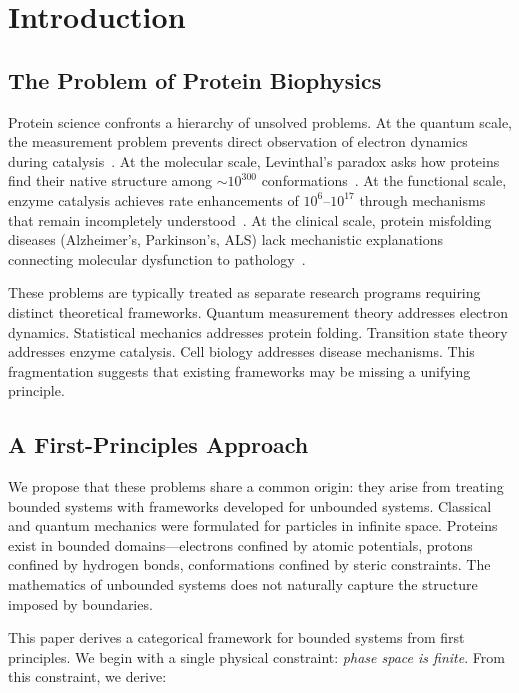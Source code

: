 \documentclass[twocolumn,aps,prx,superscriptaddress,longbibliography]{revtex4-2}
\theoremstyle{remark}
\begin{document}
\section{Introduction}
\label{sec:introduction}

\subsection{The Problem of Protein Biophysics}

Protein science confronts a hierarchy of unsolved problems. At the quantum
scale, the measurement problem prevents direct observation of electron
dynamics during catalysis~\cite{Heisenberg1927}. At the molecular scale,
Levinthal's paradox asks how proteins find their native structure among
$\sim 10^{300}$ conformations~\cite{levinthal1969fold}. At the functional
scale, enzyme catalysis achieves rate enhancements of $10^{6}$--$10^{17}$
through mechanisms that remain incompletely understood~\cite{Wolfenden2001}.
At the clinical scale, protein misfolding diseases (Alzheimer's, Parkinson's,
ALS) lack mechanistic explanations connecting molecular dysfunction to
pathology~\cite{Chiti2017}.

These problems are typically treated as separate research programs requiring
distinct theoretical frameworks. Quantum measurement theory addresses electron
dynamics. Statistical mechanics addresses protein folding. Transition state
theory addresses enzyme catalysis. Cell biology addresses disease mechanisms.
This fragmentation suggests that existing frameworks may be missing a unifying
principle.

\subsection{A First-Principles Approach}

We propose that these problems share a common origin: they arise from treating
bounded systems with frameworks developed for unbounded systems. Classical and
quantum mechanics were formulated for particles in infinite space. Proteins
exist in bounded domains---electrons confined by atomic potentials, protons
confined by hydrogen bonds, conformations confined by steric constraints.
The mathematics of unbounded systems does not naturally capture the structure
imposed by boundaries.

This paper derives a categorical framework for bounded systems from first
principles. We begin with a single physical constraint: \textit{phase space
is finite}. From this constraint, we derive:
\end{document}
